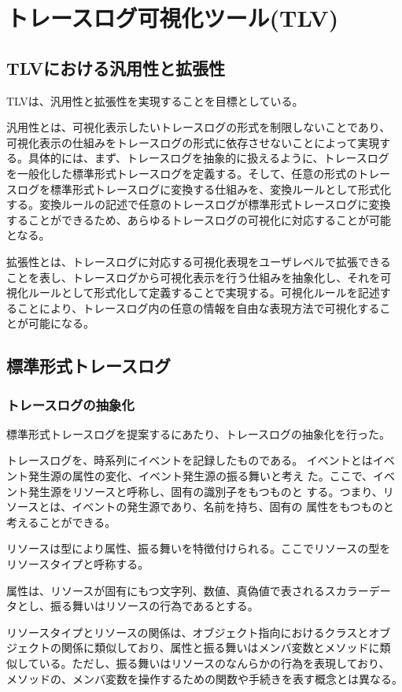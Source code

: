 \chapter{トレースログ可視化ツール(TLV)}
\section{TLVにおける汎用性と拡張性}
TLVは、汎用性と拡張性を実現することを目標としている。

汎用性とは、可視化表示したいトレースログの形式を制限しないことであり、
可視化表示の仕組みをトレースログの形式に依存させないことによって実現す
る。具体的には、まず、トレースログを抽象的に扱えるように、トレースログ
を一般化した標準形式トレースログを定義する。そして、任意の形式のトレー
スログを標準形式トレースログに変換する仕組みを、変換ルールとして形式化
する。変換ルールの記述で任意のトレースログが標準形式トレースログに変換
することができるため、あらゆるトレースログの可視化に対応することが可能
となる。

拡張性とは、トレースログに対応する可視化表現をユーザレベルで拡張できる
ことを表し、トレースログから可視化表示を行う仕組みを抽象化し、それを可
視化ルールとして形式化して定義することで実現する。可視化ルールを記述す
ることにより、トレースログ内の任意の情報を自由な表現方法で可視化するこ
とが可能になる。


\section{標準形式トレースログ}\label{sec:log}
\subsection{トレースログの抽象化}
標準形式トレースログを提案するにあたり、トレースログの抽象化を行った。

トレースログを、時系列にイベントを記録したものである。
イベントとはイベント発生源の属性の変化、イベント発生源の振る舞いと考え
た。ここで、イベント発生源をリソースと呼称し、固有の識別子をもつものと
する。つまり、リソースとは、イベントの発生源であり、名前を持ち、固有の
属性をもつものと考えることができる。

リソースは型により属性、振る舞いを特徴付けられる。ここでリソースの型を
リソースタイプと呼称する。

属性は、リソースが固有にもつ文字列、数値、真偽値で表されるスカラーデー
タとし、振る舞いはリソースの行為であるとする。

リソースタイプとリソースの関係は、オブジェクト指向におけるクラスとオブ
ジェクトの関係に類似しており、属性と振る舞いはメンバ変数とメソッドに類
似している。ただし、振る舞いはリソースのなんらかの行為を表現しており、
メソッドの、メンバ変数を操作するための関数や手続きを表す概念とは異なる。

